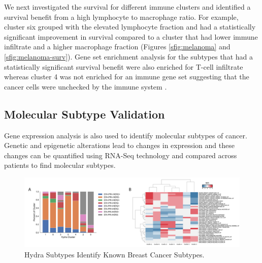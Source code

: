 \documentclass[fleqn,10pt]{wlscirep}
\begin{document}
We next investigated the survival for different immune clusters and identified a survival benefit from a high lymphocyte to macrophage ratio. For example, cluster six grouped with the elevated lymphocyte fraction and had a statistically significant improvement in survival compared to a cluster that had lower immune infiltrate and a higher macrophage fraction (Figures \ref{sfig:melanoma} and \ref{sfig:melanoma-surv}). Gene set enrichment analysis for the subtypes that had a statistically significant survival benefit were also enriched for T-cell infiltrate whereas cluster 4 was not enriched for an immune gene set suggesting that the cancer cells were unchecked by the immune system . 





\subsection*{Molecular Subtype Validation}
Gene expression analysis is also used to identify molecular subtypes of cancer. Genetic and epigenetic alterations lead to changes in expression and these changes can be quantified using RNA-Seq technology and compared across patients to find molecular subtypes.


\begin{figure}
	\centering
	\includegraphics[width=1.1\linewidth]{images/tcga-brca-subtyping-figure@2x.png}
	\caption{Hydra Subtypes Identify Known Breast Cancer Subtypes.}
	\label{sfig:brca-subtypes}
\end{figure}
\end{document}
